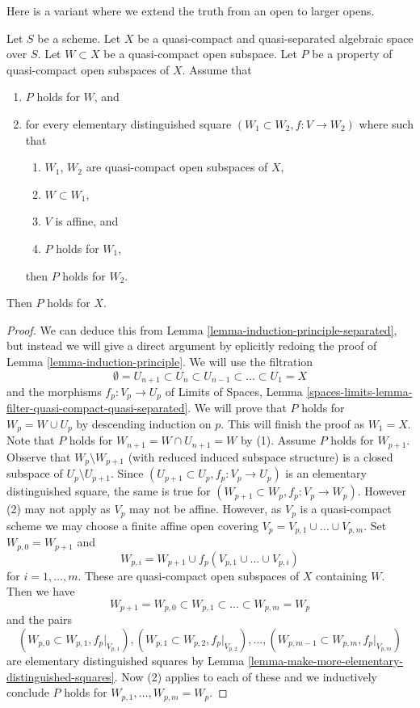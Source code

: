 \noindent
Here is a variant where we extend the truth from an open to larger opens.

\begin{lemma}
\label{lemma-induction-principle-enlarge}
Let $S$ be a scheme. Let $X$ be a quasi-compact and quasi-separated
algebraic space over $S$. Let $W \subset X$ be a quasi-compact open
subspace. Let $P$ be a property of quasi-compact open subspaces of $X$.
Assume that
\begin{enumerate}
\item $P$ holds for $W$, and
\item for every elementary distinguished square
$(W_1 \subset W_2, f : V \to W_2)$ where 
such that
\begin{enumerate}
\item $W_1$, $W_2$ are quasi-compact open subspaces of $X$,
\item $W \subset W_1$,
\item $V$ is affine, and
\item $P$ holds for $W_1$,
\end{enumerate}
then $P$ holds for $W_2$.
\end{enumerate}
Then $P$ holds for $X$.
\end{lemma}

\begin{proof}
We can deduce this from Lemma \ref{lemma-induction-principle-separated},
but instead we will give a direct argument by eplicitly redoing the proof of
Lemma \ref{lemma-induction-principle}. We will use the filtration
$$
\emptyset = U_{n + 1} \subset
U_n \subset U_{n - 1} \subset \ldots \subset U_1 = X
$$
and the morphisms $f_p : V_p \to U_p$ of
Limits of Spaces, Lemma
\ref{spaces-limits-lemma-filter-quasi-compact-quasi-separated}.
We will prove that $P$ holds for $W_p = W \cup U_p$ by descending
induction on $p$. This will finish the proof as $W_1 = X$.
Note that $P$ holds for $W_{n + 1} = W \cap U_{n + 1} = W$
by (1). Assume $P$ holds for $W_{p + 1}$. Observe that
$W_p \setminus W_{p + 1}$ (with reduced induced subspace structure)
is a closed subspace of $U_p \setminus U_{p + 1}$.
Since $(U_{p + 1} \subset U_p, f_p : V_p \to U_p)$ is an elementary
distinguished square, the same is true for
$(W_{p + 1} \subset W_p, f_p : V_p \to W_p)$.
However (2) may not apply as $V_p$ may not be affine.
However, as $V_p$ is a quasi-compact scheme we may choose
a finite affine open covering $V_p = V_{p, 1} \cup \ldots \cup V_{p, m}$.
Set $W_{p, 0} = W_{p + 1}$ and
$$
W_{p, i} = W_{p + 1} \cup f_p(V_{p, 1} \cup \ldots \cup V_{p, i})
$$
for $i = 1, \ldots, m$. These are quasi-compact open subspaces of $X$
containing $W$. Then we have
$$
W_{p + 1} = W_{p, 0} \subset
W_{p, 1} \subset \ldots \subset
W_{p, m} = W_p
$$
and the pairs
$$
(W_{p, 0} \subset W_{p, 1}, f_p|_{V_{p, 1}}),
(W_{p, 1} \subset W_{p, 2}, f_p|_{V_{p, 2}}),\ldots,
(W_{p, m - 1} \subset W_{p, m}, f_p|_{V_{p, m}})
$$
are elementary distinguished squares by
Lemma \ref{lemma-make-more-elementary-distinguished-squares}.
Now (2) applies to each of these and we inductively
conclude $P$ holds for $W_{p, 1}, \ldots, W_{p, m} = W_p$.
\end{proof}



